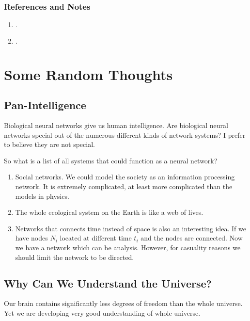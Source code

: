 \documentclass[letterpaper,10pt,english]{sphinxmanual}
\begin{document}
\subsection{References and Notes}
\label{\detokenize{topics/factor-graph:references-and-notes}}\begin{enumerate}
\item {} 
.

\item {} 
.

\end{enumerate}


\chapter{Some Random Thoughts}
\label{\detokenize{random-thoughts::doc}}\label{\detokenize{random-thoughts:some-random-thoughts}}

\section{Pan-Intelligence}
\label{\detokenize{random-thoughts:pan-intelligence}}
Biological neural networks give us human intelligence. Are biological neural networks special out of the numerous different kinds of network systems? I prefer to believe they are not special.

So what is a list of all systems that could function as a neural network?
\begin{enumerate}
\item {} 
Social networks. We could model the society as an information processing network. It is extremely complicated, at least more complicated than the models in physics.

\item {} 
The whole ecological system on the Earth is like a web of lives.

\item {} 
Networks that connects time instead of space is also an interesting idea. If we have nodes \(N_i\) located at different time \(t_i\) and the nodes are connected. Now we have a network which can be analysis. However, for casuality reasons we should limit the network to be directed.

\end{enumerate}


\section{Why Can We Understand the Universe?}
\label{\detokenize{random-thoughts:why-can-we-understand-the-universe}}
Our brain contains significantly less degrees of freedom than the whole universe. Yet we are developing very good understanding of whole universe.
\end{document}
